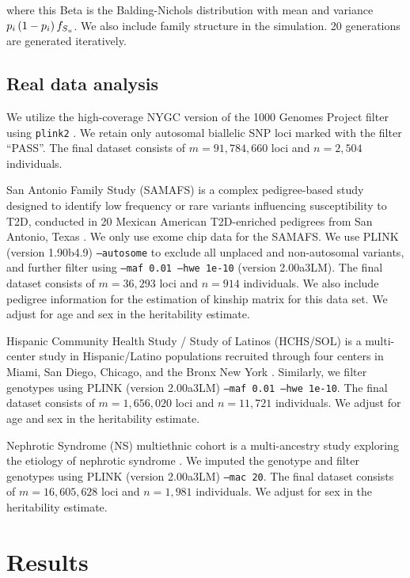 \documentclass[11pt]{article}
\begin{document}
where this Beta is the Balding-Nichols distribution \citep{balding_method_1995} with mean \pit and variance $\pit \left( 1 - \pit \right) \ft[S_u]$.
We also include family structure in the simulation.
20 generations are generated iteratively.

\subsection{Real data analysis}

We utilize the high-coverage NYGC version of the 1000 Genomes Project \citep{fairley_international_2020} filter using \texttt{plink2} \citep{chang_second-generation_2015}. We retain only autosomal biallelic SNP loci marked with the filter ``PASS''. The final dataset consists of $m=91,784,660$ loci and $n=2,504$ individuals.

San Antonio Family Study (SAMAFS) is a complex pedigree-based study designed to identify low frequency or rare variants influencing susceptibility to T2D, conducted in 20 Mexican American T2D-enriched pedigrees from San Antonio, Texas  \citep{mitchell1996genetic}. We only use exome chip data for the SAMAFS. We use PLINK (version 1.90b4.9) \texttt{--autosome} to exclude all unplaced and non-autosomal variants, and further filter using \texttt{--maf 0.01 --hwe 1e-10} (version 2.00a3LM). The final dataset consists of $m=36,293$ loci and $n=914 $ individuals. We also include pedigree information for the estimation of kinship matrix for this data set. We adjust for age and sex in the heritability estimate.

Hispanic Community Health Study / Study of Latinos (HCHS/SOL) is a multi-center study in Hispanic/Latino populations recruited through four centers in Miami, San Diego, Chicago, and the Bronx New York \citep{sorlie2010design}. Similarly, we filter genotypes using PLINK (version 2.00a3LM) \texttt{--maf 0.01 --hwe 1e-10}. The final dataset consists of $m=1,656,020 $ loci and $n=11,721 $ individuals. We adjust for age and sex in the heritability estimate.

Nephrotic Syndrome (NS) multiethnic cohort is a multi-ancestry study exploring the etiology of nephrotic syndrome \citep{cason2023genetic}. We imputed the genotype and filter genotypes using PLINK (version 2.00a3LM) \texttt{--mac 20}. The final dataset consists of $m=16,605,628  $ loci and $n=1,981  $ individuals. We adjust for sex in the heritability estimate.

\section{Results}
\end{document}
